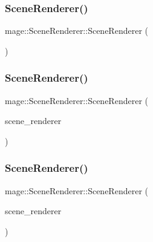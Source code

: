 \subsubsection{\texorpdfstring{Scene\+Renderer()}{SceneRenderer()}\hspace{0.1cm}{\footnotesize\ttfamily [1/3]}}
{\footnotesize\ttfamily mage\+::\+Scene\+Renderer\+::\+Scene\+Renderer (\begin{DoxyParamCaption}{ }\end{DoxyParamCaption})}

\hypertarget{classmage_1_1_scene_renderer_a9ea97945a7675ef805f00fb437a3d1aa}{}\label{classmage_1_1_scene_renderer_a9ea97945a7675ef805f00fb437a3d1aa} 
\subsubsection{\texorpdfstring{Scene\+Renderer()}{SceneRenderer()}\hspace{0.1cm}{\footnotesize\ttfamily [2/3]}}
{\footnotesize\ttfamily mage\+::\+Scene\+Renderer\+::\+Scene\+Renderer (\begin{DoxyParamCaption}\item[{const \hyperlink{classmage_1_1_scene_renderer}{Scene\+Renderer} \&}]{scene\+\_\+renderer }\end{DoxyParamCaption})\hspace{0.3cm}{\ttfamily [delete]}}

\hypertarget{classmage_1_1_scene_renderer_ab9846f0a77e2bc5e9eeb00aed67424eb}{}\label{classmage_1_1_scene_renderer_ab9846f0a77e2bc5e9eeb00aed67424eb} 
\subsubsection{\texorpdfstring{Scene\+Renderer()}{SceneRenderer()}\hspace{0.1cm}{\footnotesize\ttfamily [3/3]}}
{\footnotesize\ttfamily mage\+::\+Scene\+Renderer\+::\+Scene\+Renderer (\begin{DoxyParamCaption}\item[{\hyperlink{classmage_1_1_scene_renderer}{Scene\+Renderer} \&\&}]{scene\+\_\+renderer }\end{DoxyParamCaption})\hspace{0.3cm}{\ttfamily [default]}}

